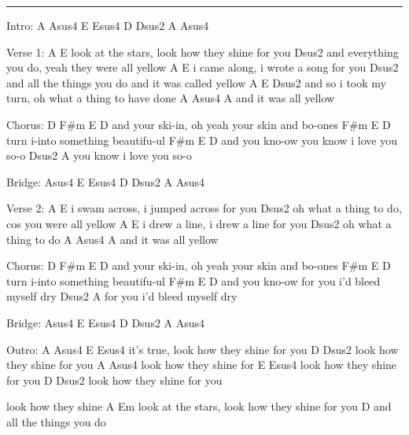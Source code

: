 \noindent\rule{\columnwidth}{1pt}

\begin{lstsong}
Intro: A   Asus4   E   Esus4   D   Dsus2   A   Asus4

Verse 1:
A                                         E
look at the stars, look how they shine for you
                    Dsus2
and everything you do, yeah they were all yellow
A                               E
i came along, i wrote a song for you
                        Dsus2
and all the things you do and it was called yellow
A               E                                Dsus2
and so i took my turn, oh what a thing to have done
                     A   Asus4   A
and it was all yellow

Chorus:
D             F#m              E           D
and your ski-in, oh yeah your skin and bo-ones
       F#m            E        D
turn i-into something beautifu-ul
            F#m           E           D                       
and you kno-ow you know i love you so-o
Dsus2                  A
you know i love you so-o

Bridge: Asus4   E   Esus4   D   Dsus2   A   Asus4

Verse 2:
A                                 E
i swam across, i jumped across for you
                    Dsus2
oh what a thing to do, cos you were all yellow
A                               E
i drew a line, i drew a line for you
                    Dsus2
oh what a thing to do
                     A   Asus4   A
and it was all yellow

Chorus:
D             F#m              E           D
and your ski-in, oh yeah your skin and bo-ones
       F#m            E        D
turn i-into something beautifu-ul
            F#m            E            D                       
and you kno-ow for you i'd bleed myself dry
Dsus2                    A
for you i'd bleed myself dry

Bridge: Asus4   E   Esus4   D   Dsus2   A   Asus4

Outro:
     A   Asus4                     E   Esus4
it's true, look how they shine for you
                        D   Dsus2
look how they shine for you
                       A   Asus4
look how they shine for
                        E   Esus4
look how they shine for you
                        D   Dsus2
look how they shine for you

look how they shine
A                                         Em
 look at the stars, look how they shine for you
                       D
and all the things you do
\end{lstsong}
\newpage

